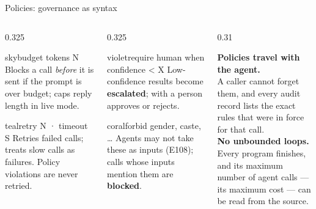 \documentclass[aspectratio=169,11pt]{beamer}
\begin{document}
\begin{frame}{Policies: governance as syntax}
\vspace{1mm}
\begin{columns}[T]
\begin{column}{0.325\textwidth}
\begin{card}{sky}{budget tokens N}
Blocks a call \emph{before} it is sent if the prompt is over budget; caps reply length in live mode.\\[0.5mm]
\end{card}
\begin{card}{teal}{retry N · timeout S}
Retries failed calls; treats slow calls as failures. Policy violations are never retried.\\[0.5mm]
\end{card}
\end{column}
\begin{column}{0.325\textwidth}
\begin{card}{violet}{require human when confidence < X}
Low-confidence results become \textbf{escalated}; with  a person approves or rejects.\\[0.5mm]
\end{card}
\begin{card}{coral}{forbid gender, caste, \dots}
Agents may not take these as inputs (E108); calls whose inputs mention them are \textbf{blocked}.\\[0.5mm]
\end{card}
\end{column}
\begin{column}{0.31\textwidth}
\begin{tcolorbox}[enhanced,colback=goldlight,colframe=gold,arc=3pt,boxrule=0.6pt,fontupper=\footnotesize\raggedright]
\textbf{\color{navy}Policies travel with the agent.}\\[1mm]
A caller cannot forget them, and every audit record lists the exact rules that were in force for that call.\\[2mm]
\textbf{\color{navy}No unbounded loops.}\\[1mm]
Every program finishes, and its maximum number of agent calls --- its maximum cost --- can be read from the source.
\end{tcolorbox}
\end{column}
\end{columns}
\end{frame}
\end{document}
